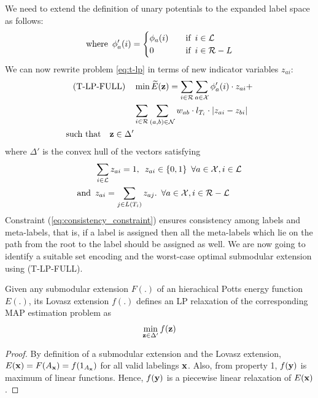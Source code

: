 {{{We need to extend the definition of unary potentials to the expanded label space as follows:
\begin{align}
    \text{where} \enskip    \phi'_{a}(i) =  \begin{cases} 
        \phi_{a}(i) \quad &\text{if} \enskip i \in {\mathcal L} \\
        0  \quad &\text{if} \enskip i \in {\mathcal R - L} \\
    \end{cases}
\end{align}
%
We can now rewrite problem \eqref{eq:t-lp} in terms of new indicator variables $z_{ai}$:
%
\begin{align}
    \text{(T-LP-FULL)} \quad &\min \widetilde{E}({\bf z}) = \sum_{i \in \mathcal{R}} \sum_{a \in {\mathcal X}} \phi_a'(i) \cdot z_{ai} + \nonumber \\
            &\sum_{i \in \mathcal{R}} \sum_{(a, b) \in {\mathcal N}} w_{ab} \cdot l_{T_i} \cdot |z_{ai} - z_{bi}| \nonumber \\
    \text{such that} \quad {\bf z} \in \Delta'
\end{align}
   where $\Delta'$ is the convex hull of the vectors satisfying
\begin{align}
    \enskip &\sum_{i \in \mathcal{L}} z_{ai} = 1, \enskip z_{ai} \in \{0, 1\} \enskip \forall a \in {\mathcal X}, i \in \mathcal{L} \\
    \text{and} \enskip &z_{ai} = \sum_{j \in L(T_i) } z_{aj}.\enskip \forall a \in {\mathcal X}, i \in \mathcal{R - L} %
\end{align}
%
Constraint (\ref{eq:consistency_constraint}) ensures consistency among labels and meta-labels, that is, if a label is assigned then all the meta-labels which lie on the path from the root to the label should be assigned as well. We are now going to identify a suitable set encoding and the worst-case optimal submodular extension using (T-LP-FULL).


{\lemma Given any submodular extension $F(.)$ of an hierachical Potts energy function $E(.)$, its Lovasz extension $f(.)$ defines an LP relaxation of the corresponding MAP estimation problem as
\begin{align}
    \min_{{\bf z} \in \Delta'} f({\bf z}) 
\end{align}

\begin{proof}
    By definition of a submodular extension and the Lovasz extension, $E({\bf x}) = F(A_{\bf x}) = f(1_{A_{\bf x}})$ for all valid labelings ${\bf x}$. Also, from property 1, $f({\bf y})$ is maximum of linear functions. Hence, $f({\bf y})$ is a piecewise linear relaxation of $E({\bf x})$.


\end{proof}}}}}

